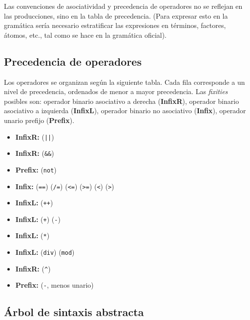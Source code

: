 \documentclass{article}
\begin{document}
Las convenciones de asociatividad y precedencia de operadores no se reflejan
en las producciones, sino en la tabla de precedencia.
(Para expresar esto en la gram\'atica ser\'ia necesario estratificar las expresiones
en t\'erminos, factores, \'atomos, etc., tal como se hace en la gram\'atica oficial).
\bigskip



\subsection{Precedencia de operadores}

Los operadores se organizan seg\'un la siguiente tabla.
Cada fila corresponde a un nivel de precedencia, ordenados de menor a mayor precedencia.
Las {\em fixities} posibles son:
operador binario asociativo a derecha ({\bf InfixR}),
operador binario asociativo a izquierda ({\bf InfixL}),
operador binario no asociativo ({\bf Infix}),
operador unario prefijo ({\bf Prefix}).

\begin{itemize}
\item {\bf InfixR:}  (\texttt{||})
\item {\bf InfixR:}  (\texttt{\&\&})
\item {\bf Prefix:}  (\texttt{not})
\item {\bf Infix:}
   (\texttt{==})
   (\texttt{/=})
   (\texttt{<=})
   (\texttt{>=})
   (\texttt{<})
   (\texttt{>})
\item {\bf InfixL:}
   (\texttt{++})
\item {\bf InfixL:}
   (\texttt{+})
   (\texttt{-})
\item {\bf InfixL:}
   (\texttt{*})
\item {\bf InfixL:}
   (\texttt{div})
   (\texttt{mod})
\item {\bf InfixR:}
   (\texttt{\^})
\item {\bf Prefix:}
   (\texttt{-}, menos unario)
\end{itemize}

\subsection{\'Arbol de sintaxis abstracta}
\end{document}
